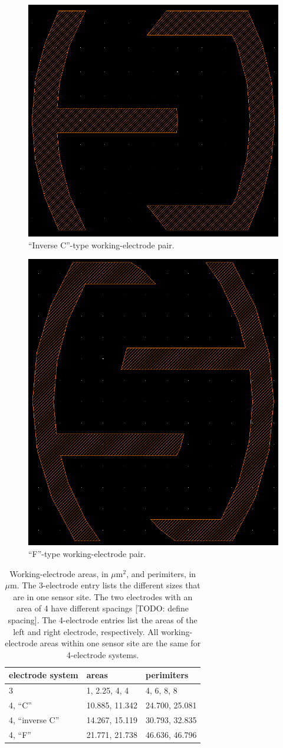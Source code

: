 \begin{figure}
	\centering
	\includegraphics[width=0.3\linewidth]{figures/4-I.png}
	\caption{``Inverse C''-type working-electrode pair.}
	\label{4-I}
\end{figure}

\begin{figure}
	\centering
	\includegraphics[width=0.3\linewidth]{figures/4-F.png}
	\caption{``F''-type working-electrode pair.}
	\label{4-F}
\end{figure}

\begin{table}
	\begin{tabular}{l|l|l}
		\textbf{electrode system} & \textbf{areas} & \textbf{perimiters} \\
		\hline
		3 & 1, 2.25, 4, 4 & 4, 6, 8, 8 \\
		4, ``C'' & 10.885, 11.342 & 24.700, 25.081 \\
		4, ``inverse C'' & 14.267, 15.119 & 30.793, 32.835 \\
		4, ``F'' & 21.771, 21.738 & 46.636, 46.796
	\end{tabular}
	\caption[Working-electrode areas and perimiters.]{Working-electrode areas, in $\mu \mathrm{m}^2$, and perimiters, in $\mu \mathrm{m}$. The 3-electrode entry lists the different sizes that are in one sensor site. The two electrodes with an area of 4 have different spacings [TODO: define spacing]. The 4-electrode entries list the areas of the left and right electrode, respectively. All working-electrode areas within one sensor site are the same for 4-electrode systems.}
	\label{electrode-area}
\end{table}

